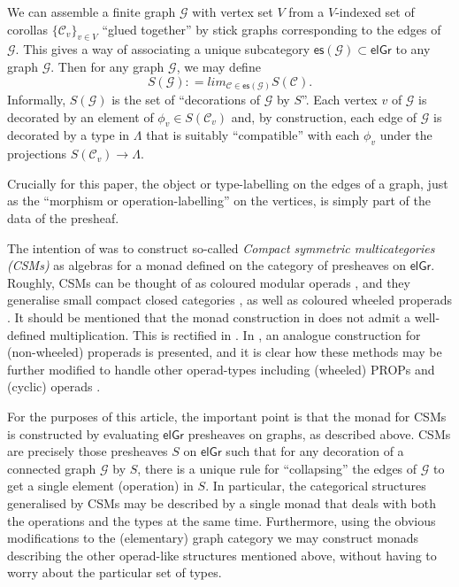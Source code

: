 \documentclass[11pt, article, oneside]{memoir}
\theoremstyle{plain}
\theoremstyle{definition}
\theoremstyle{remark}
\newcommand{\stodo}[2][]{\todo[color=red!30, #1]{#2}}
\newcommand\el{\mathsf{elGr}}
\newcommand\g{\mathcal G}
\newcommand\cc{\mathcal C}
\newcommand{\esG}[1][\mathcal{G}]{\ensuremath{\mathsf{es}{(#1)}}}
\begin{document}
We can assemble a finite graph $\g$ with vertex set $V$ from a $V$-indexed set of corollas $\{\cc_v\}_{v \in V}$  ``glued together'' by stick graphs corresponding to the edges of $\g$. This gives a way of associating a unique subcategory $\esG \subset \el$ to any graph $\g$. Then for any graph $\g$, we may define \[
S(\g) : = lim_{\cc \in \esG} S(\cc).\]
Informally, $S(\g)$ is the set of ``decorations of $\g$ by $S$''. Each vertex $v$ of $ \g$ is decorated by an element of $\phi_v \in S(\cc_v)$ and, by construction, each edge of $\g$ is decorated by a type in $ \Lambda$ that is suitably ``compatible'' with each $\phi_v$ under the projections $S(\cc_v) \to \Lambda$.

\stodo[inline]{Insert suitable graphic}

Crucially for this paper, the object or type-labelling on the edges of a graph, just as the ``morphism or operation-labelling'' on the vertices, is simply part of the data of the presheaf. 

The intention of \cite{Joyal.Kock} was to construct so-called \emph{Compact symmetric multicategories (CSMs)} as algebras for a monad defined on the category of presheaves on $\el$. Roughly, CSMs can be thought of as coloured modular operads \cite{}, and they generalise small compact closed categories \cite{}, as well as coloured wheeled properads \cite{}. It should be mentioned that the monad construction in \cite{Joyal.Kock} does not admit a well-defined multiplication. This is rectified in \cite{Raynor}. In \cite{}, an analogue construction for (non-wheeled) properads is presented, and it is clear how these methods may be further modified to handle other operad-types including (wheeled) PROPs \cite{} and (cyclic) operads \cite{}. 

\stodo[inline]{Add references.}

For the purposes of this article, the important point is that the monad for CSMs is constructed by evaluating $\el$ presheaves on graphs, as described above. CSMs are precisely those presheaves $S$ on $\el$ such that for any decoration of a connected graph $\g$ by $S$, there is a unique rule for ``collapsing'' the edges of $\g$ to get a single element (operation) in $S$. 
  In particular, the categorical structures generalised by CSMs may be described by a single monad that deals with both the operations and the types at the same time. Furthermore, using the obvious modifications to the (elementary) graph category we may construct monads describing the other operad-like structures mentioned above, without having to worry about the particular set of types.
\end{document}
